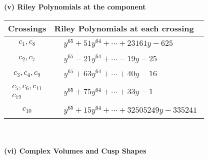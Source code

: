 \documentclass[1p]{elsarticle_modified}
\theoremstyle{definition}
\begin{document}
\newpage\renewcommand{\arraystretch}{1}
\flushleft \textbf{(v) Riley Polynomials at the component}\newline \\
\begin{tabular}{m{50pt}|m{274pt}}
Crossings & \hspace{64pt}Riley Polynomials at each crossing \\
\hline $$\begin{aligned}c_{1},c_{8}\end{aligned}$$&$\begin{aligned}
&y^{65}+51 y^{64}+\cdots+23161 y-625
\end{aligned}$\\
\hline $$\begin{aligned}c_{2},c_{7}\end{aligned}$$&$\begin{aligned}
&y^{65}-21 y^{64}+\cdots-19 y-25
\end{aligned}$\\
\hline $$\begin{aligned}c_{3},c_{4},c_{9}\end{aligned}$$&$\begin{aligned}
&y^{65}+63 y^{64}+\cdots+40 y-16
\end{aligned}$\\
\hline $$\begin{aligned}c_{5},c_{6},c_{11}\\c_{12}\end{aligned}$$&$\begin{aligned}
&y^{65}+75 y^{64}+\cdots+33 y-1
\end{aligned}$\\
\hline $$\begin{aligned}c_{10}\end{aligned}$$&$\begin{aligned}
&y^{65}+15 y^{64}+\cdots+32505249 y-335241
\end{aligned}$\\
\hline
\end{tabular}\\~\\
\newpage\flushleft \textbf{(vi) Complex Volumes and Cusp Shapes}
\end{document}
